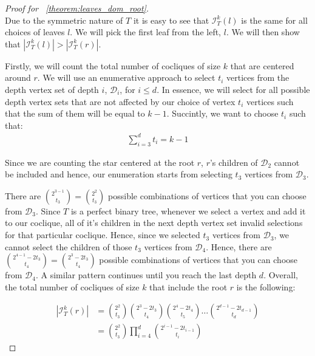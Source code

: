 \documentclass{amsart}
\theoremstyle{definition}
\begin{document}
\begin{proof}[Proof for ~\ref{theorem:leaves_dom_root}]
	$ $ \\

	Due to the symmetric nature of $T$ it is easy to see that $\mathcal{I}^k_T(l)$ is the same for all choices of leaves $l$. We will pick the first leaf from the left, $l$. We will then show that $|\mathcal{I}^k_T(l)| > |\mathcal{I}^k_T(r)|.$

	Firstly, we will count the total number of cocliques of size $k$ that are centered around $r$. We will use an enumerative approach to select $t_i$ vertices from the depth vertex set of depth $i$, $\mathcal{D}_i$, for $i \leq d$. In essence, we will select for all possible depth vertex sets that are not affected by our choice of vertex $t_i$ vertices such that the sum of them will be equal to $k - 1$. Succintly, we want to choose $t_i$ such that:
	\begin{align*}
		\displaystyle\sum_{i = 3}^{d}t_i = k - 1
	\end{align*}

	Since we are counting the star centered at the root $r$, $r$'s children of $\mathcal{D}_2$ cannot be included and hence, our enumeration starts from selecting $t_3$ vertices from $\mathcal{D}_3$.

	There are $\binom{2^{3 - 1}}{t_3} = \binom{2^2}{t_3}$ possible combinations of vertices that you can choose from $\mathcal{D}_3$. Since $T$ is a perfect binary tree, whenever we select a vertex and add it to our coclique, all of it's children in the next depth vertex set invalid selections for that particular coclique. Hence, since we selected $t_3$ vertices from $\mathcal{D}_3$, we cannot select the children of those $t_3$ vertices from $\mathcal{D}_4$. Hence, there are $\binom{2^{4 - 1} - 2t_3}{t_4} = \binom{2^3 - 2t_3}{t_4}$ possible combinations of vertices that you can choose from $\mathcal{D}_4$. A similar pattern continues until you reach the last depth $d$. Overall, the total number of cocliques of size $k$ that include the root $r$ is the following:

	\begin{align}
		|\mathcal{I}^k_T(r)| & = \binom{2^2}{t_3} \binom{2^3 - 2t_3}{t_4} \binom{2^4 - 2t_4}{t_5}\dots \binom{2^{d - 1} - 2t_{d - 1}}{t_d}
		\nonumber
		\\
		                     & = \binom{2^2}{t_3}\displaystyle\prod_{i = 4}^{d} \binom{2^{i - 1} - 2t_{i - 1}}{t_i}
		\label{eq:root_star_card}
	\end{align}


\end{proof}
\end{document}
